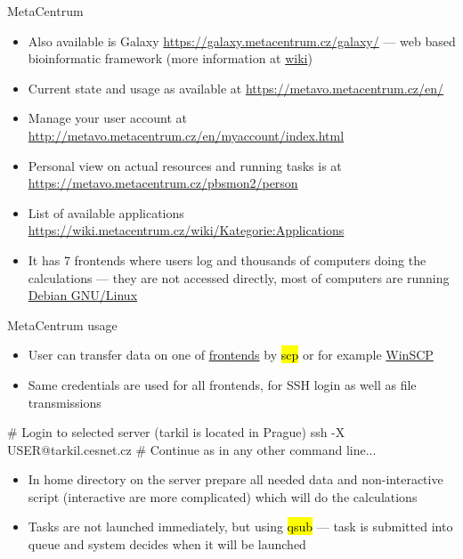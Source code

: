 \documentclass[compress, ucs, xelatex, 11pt, xcolor=svgnames,
  hyperref={
    bookmarks=true,
    unicode=true,
    colorlinks=true,
    pdftitle={Linux, command line and MetaCentrum},
    plainpages=false,
    pdfauthor={Vojtech Zeisek},
    pdfsubject={Course about use of Linux command line, writing shell scripts and using MetaCentrum of CESNET},
    pdfcreator={XeLaTeX, http://www.xelatex.org/},
    pdfkeywords={Linux, GNU, BASH, shell, command line, MetaCentrum},
    linkcolor=Sienna,
    anchorcolor=black,
    citecolor=green,
    filecolor=magenta,
    menucolor=Sienna,
    urlcolor=cyan,
    pdftex},
  url={hyphens, lowtilde} %
  ]{beamer}
\renewcommand{\texttt}[1]{\hl{\ttfamily #1}}
\begin{document}
\begin{frame}{MetaCentrum}
\begin{itemize}
  \item Also available is Galaxy \url{https://galaxy.metacentrum.cz/galaxy/} --- web based bioinformatic framework (more information at \href{https://wiki.metacentrum.cz/wiki/Galaxy_application}{wiki})
  \item Current state and usage as available at \url{https://metavo.metacentrum.cz/en/}
  \item Manage your user account at \url{http://metavo.metacentrum.cz/en/myaccount/index.html}
  \item Personal view on actual resources and running tasks is at \url{https://metavo.metacentrum.cz/pbsmon2/person}
  \item List of available applications \url{https://wiki.metacentrum.cz/wiki/Kategorie:Applications}
  \item It has 7 frontends where users log and thousands of computers doing the calculations --- they are not accessed directly, most of computers are running \href{https://www.debian.org/}{Debian GNU/Linux}
\end{itemize}
\end{frame}

\begin{frame}[fragile]{MetaCentrum usage}
\begin{itemize}
  \item User can transfer data on one of \href{https://wiki.metacentrum.cz/wiki/Frontend}{frontends} by \texttt{scp} or for example \href{http://winscp.net/eng/index.php}{WinSCP}
  \item Same credentials are used for all frontends, for SSH login as well as file transmissions
\end{itemize}
  \begin{bashcode}
    # Login to selected server (tarkil is located in Prague)
    ssh -X USER@tarkil.cesnet.cz
    # Continue as in any other command line...
  \end{bashcode}
\begin{itemize}
  \item In home directory on the server prepare all needed data and non-interactive script (interactive are more complicated) which will do the calculations
  \item Tasks are not launched immediately, but using \texttt{qsub} --- task is submitted into queue and system decides when it will be launched
\end{itemize}
\end{frame}
\end{document}
